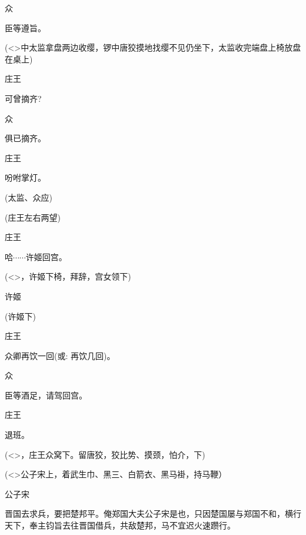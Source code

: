 {众\hspace{40pt}~

臣等遵旨。

(\textless{}\!\textgreater{}中太监拿盘两边收缨，锣中唐狡摸地找缨不见仍坐下，太监收完端盘上椅放盘在桌上)

庄王\hspace{30pt}~

可曾摘齐?

众\hspace{40pt}~

俱已摘齐。

庄王\hspace{30pt}~

吩咐掌灯。

(太监、众应)

(庄王左右两望)

庄王\hspace{30pt}~

哈$\cdots{}\cdots{}$许姬回宫。

(\textless{}\!\textgreater{}，许姬下椅，拜辞，宫女领下)

许姬\hspace{30pt}~


(许姬下)

庄王\hspace{30pt}~

众卿再饮一回({\akai 或}: 再饮几回)。

众\hspace{40pt}~

臣等酒足，请驾回宫。

庄王\hspace{30pt}~

退班。

(\textless{}\!\textgreater{}，庄王众窝下。留唐狡，狡比势、摸颈，怕介，下)

\vspace{5pt}

(\textless{}\!\textgreater{}公子宋上，着武生巾、黑三、白箭衣、黑马褂，持马鞭）

公子宋

晋国去求兵，要把楚邦平。俺郑国大夫公子宋是也，只因楚国屡与郑国不和，横行天下，奉主钧旨去往晋国借兵，共敌楚邦，马不宜迟火速躜行。

}
